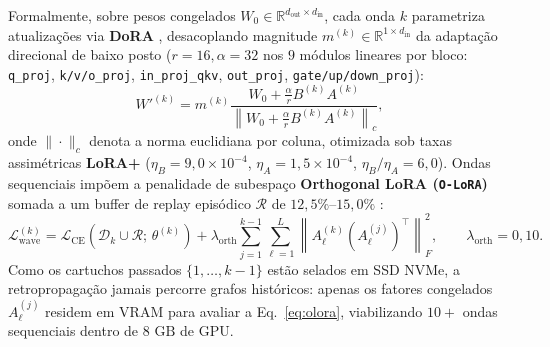 \documentclass[10pt,a4paper]{article}
\begin{document}
Formalmente, sobre pesos congelados $W_0 \in \mathbb{R}^{d_{\text{out}} \times d_{\text{in}}}$, cada onda $k$ parametriza atualiza\c{c}\~oes via \textbf{DoRA} \cite{liu2024dora}, desacoplando magnitude $m^{(k)} \in \mathbb{R}^{1 \times d_{\text{in}}}$ da adapta\c{c}\~ao direcional de baixo posto ($r=16, \alpha=32$ nos $9$ m\'odulos lineares por bloco: \texttt{q\_\allowbreak{}proj}, \texttt{k/v/o\_\allowbreak{}proj}, \texttt{in\_\allowbreak{}proj\_\allowbreak{}qkv}, \texttt{out\_\allowbreak{}proj}, \texttt{gate/up/down\_\allowbreak{}proj}):
\begin{equation}
  W'^{(k)} = m^{(k)} \frac{W_0 + \frac{\alpha}{r} B^{(k)} A^{(k)}}{\left\| W_0 + \frac{\alpha}{r} B^{(k)} A^{(k)} \right\|_c},
  \label{eq:dora}
\end{equation}
onde $\|\cdot\|_c$ denota a norma euclidiana por coluna, otimizada sob taxas assim\'etricas \textbf{LoRA+} \cite{hayou2024loraplus} ($\eta_B = 9,0 \times 10^{-4}$, $\eta_A = 1,5 \times 10^{-4}$, $\eta_B / \eta_A = 6,0$). Ondas sequenciais imp\~oem a penalidade de subespa\c{c}o \textbf{Orthogonal LoRA (\texttt{O-LoRA})} \cite{wang2023olora,liang2024inflora} somada a um buffer de replay epis\'odico $\mathcal{R}$ de $12,5\%\text{--}15,0\%$ \cite{rolnick2019experience}:
\begin{equation}
  \mathcal{L}_{\text{wave}}^{(k)} = \mathcal{L}_{\text{CE}}\!\left(\mathcal{D}_k \cup \mathcal{R};\, \theta^{(k)}\right) + \lambda_{\text{orth}} \sum_{j=1}^{k-1} \sum_{\ell=1}^{L} \left\| A_\ell^{(k)} \left(A_\ell^{(j)}\right)^{\!\top} \right\|_F^2, \qquad \lambda_{\text{orth}} = 0,10.
  \label{eq:olora}
\end{equation}
Como os cartuchos passados $\{1,\dots,k-1\}$ est\~ao selados em SSD NVMe, a retropropaga\c{c}\~ao jamais percorre grafos hist\'oricos: apenas os fatores congelados $A_\ell^{(j)}$ residem em VRAM para avaliar a Eq.~\ref{eq:olora}, viabilizando $10+$ ondas sequenciais dentro de $8\text{ GB}$ de GPU.
\end{document}
